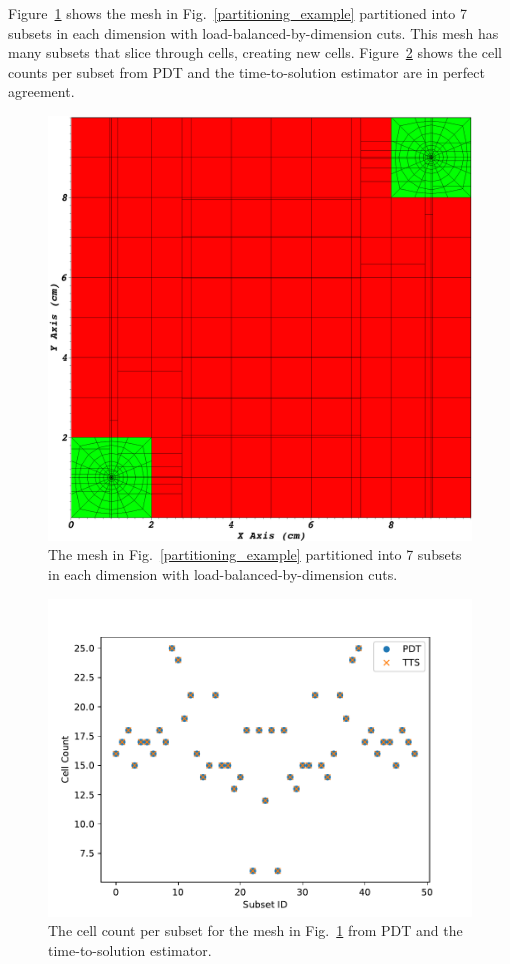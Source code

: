 Figure~\ref{ubp_7x7} shows the mesh in Fig.~\ref{partitioning_example} partitioned into 7 subsets in each dimension with load-balanced-by-dimension cuts. This mesh has many subsets that slice through cells, creating new cells. Figure~\ref{cell_comp} shows the cell counts per subset from PDT and the time-to-solution estimator are in perfect agreement.
\begin{figure}[H]
\centering
\includegraphics[scale=0.15]{../figures/spiderweb_7x7_lbd.png}
\caption{The mesh in Fig.~\ref{partitioning_example} partitioned into 7 subsets in each dimension with load-balanced-by-dimension cuts.}
\label{ubp_7x7}
\end{figure}
\begin{figure}[H]
\centering
\includegraphics[scale=0.75]{../figures/spiderweb_cell_comp_7x7.pdf}
\caption{The cell count per subset for the mesh in Fig.~\ref{ubp_7x7} from PDT and the time-to-solution estimator.}
\label{cell_comp}
\end{figure}

